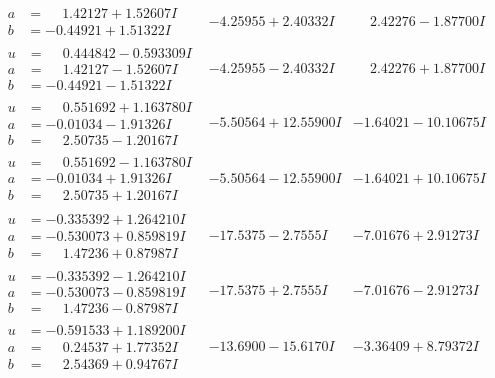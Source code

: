 \documentclass[1p]{elsarticle_modified}
\theoremstyle{definition}
\begin{document}
$$\begin{array}{c|c|c}
\begin{aligned}
a &= \phantom{-}1.42127 + 1.52607 I \\
b &= -0.44921 + 1.51322 I\end{aligned}
 & -4.25955 + 2.40332 I & \phantom{-}2.42276 - 1.87700 I \\ \hline\begin{aligned}
u &= \phantom{-}0.444842 - 0.593309 I \\
a &= \phantom{-}1.42127 - 1.52607 I \\
b &= -0.44921 - 1.51322 I\end{aligned}
 & -4.25955 - 2.40332 I & \phantom{-}2.42276 + 1.87700 I \\ \hline\begin{aligned}
u &= \phantom{-}0.551692 + 1.163780 I \\
a &= -0.01034 - 1.91326 I \\
b &= \phantom{-}2.50735 - 1.20167 I\end{aligned}
 & -5.50564 + 12.55900 I & -1.64021 - 10.10675 I \\ \hline\begin{aligned}
u &= \phantom{-}0.551692 - 1.163780 I \\
a &= -0.01034 + 1.91326 I \\
b &= \phantom{-}2.50735 + 1.20167 I\end{aligned}
 & -5.50564 - 12.55900 I & -1.64021 + 10.10675 I \\ \hline\begin{aligned}
u &= -0.335392 + 1.264210 I \\
a &= -0.530073 + 0.859819 I \\
b &= \phantom{-}1.47236 + 0.87987 I\end{aligned}
 & -17.5375 - 2.7555 I & -7.01676 + 2.91273 I \\ \hline\begin{aligned}
u &= -0.335392 - 1.264210 I \\
a &= -0.530073 - 0.859819 I \\
b &= \phantom{-}1.47236 - 0.87987 I\end{aligned}
 & -17.5375 + 2.7555 I & -7.01676 - 2.91273 I \\ \hline\begin{aligned}
u &= -0.591533 + 1.189200 I \\
a &= \phantom{-}0.24537 + 1.77352 I \\
b &= \phantom{-}2.54369 + 0.94767 I\end{aligned}
 & -13.6900 - 15.6170 I & -3.36409 + 8.79372 I \\ \hline\begin{aligned}

\end{aligned}
\end{array}$$
\end{document}
